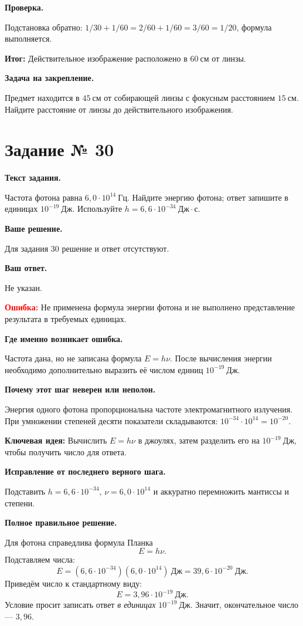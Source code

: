 \documentclass[11pt,a4paper]{article}
\newcommand{\reviewblock}[2]{\par\medskip\noindent\textbf{#1}\par\noindent#2\par}
\newcommand{\errorblock}[1]{\par\medskip\noindent\textcolor{red}{\textbf{Ошибка:}} #1\par}
\newcommand{\ideablock}[1]{\par\medskip\noindent\textcolor{blue!60!black}{\textbf{Ключевая идея:}} #1\par}
\newcommand{\resultblock}[1]{\par\medskip\noindent\textcolor{teal!60!black}{\textbf{Итог:}} #1\par}
\begin{document}
\reviewblock{Проверка.}{Подстановка обратно: $1/30+1/60=2/60+1/60=3/60=1/20$, формула выполняется.}

\resultblock{Действительное изображение расположено в $60\ \text{см}$ от линзы.}

\reviewblock{Задача на закрепление.}{Предмет находится в $45\ \text{см}$ от собирающей линзы с фокусным расстоянием $15\ \text{см}$. Найдите расстояние от линзы до действительного изображения.}
\newpage
{}\label{task:30}

\section*{Задание № 30}

\reviewblock{Текст задания.}{Частота фотона равна $6{,}0\cdot10^{14}\ \text{Гц}$. Найдите энергию фотона; ответ запишите в единицах $10^{-19}\ \text{Дж}$. Используйте $h=6{,}6\cdot10^{-34}\ \text{Дж}\cdot\text{с}$.}

\reviewblock{Ваше решение.}{Для задания 30 решение и ответ отсутствуют.}

\reviewblock{Ваш ответ.}{Не указан.}

\errorblock{Не применена формула энергии фотона и не выполнено представление результата в требуемых единицах.}

\reviewblock{Где именно возникает ошибка.}{Частота дана, но не записана формула $E=h\nu$. После вычисления энергии необходимо дополнительно выразить её числом единиц $10^{-19}\ \text{Дж}$.}

\reviewblock{Почему этот шаг неверен или неполон.}{Энергия одного фотона пропорциональна частоте электромагнитного излучения. При умножении степеней десяти показатели складываются: $10^{-34}\cdot10^{14}=10^{-20}$.}

\ideablock{Вычислить $E=h\nu$ в джоулях, затем разделить его на $10^{-19}\ \text{Дж}$, чтобы получить число для ответа.}

\reviewblock{Исправление от последнего верного шага.}{Подставить $h=6{,}6\cdot10^{-34}$, $\nu=6{,}0\cdot10^{14}$ и аккуратно перемножить мантиссы и степени.}

\reviewblock{Полное правильное решение.}{Для фотона справедлива формула Планка
\[E=h\nu.\]
Подставляем числа:
\[E=(6{,}6\cdot10^{-34})(6{,}0\cdot10^{14})\ \text{Дж}=39{,}6\cdot10^{-20}\ \text{Дж}.\]
Приведём число к стандартному виду:
\[E=3{,}96\cdot10^{-19}\ \text{Дж}.\]
Условие просит записать ответ \emph{в единицах} $10^{-19}\ \text{Дж}$. Значит, окончательное число --- $3{,}96$.}
\end{document}
